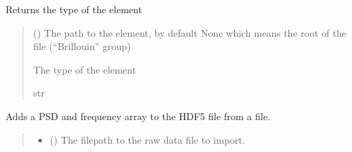 \documentclass[letterpaper,10pt,english]{sphinxmanual}
\begin{document}
\begin{fulllineitems}

\begin{fulllineitems}
\label{\detokenize{source/_autosummary/HDF5_BLS.Wrapper:HDF5_BLS.Wrapper.get_type}}
\pysigstartsignatures
\pysiglinewithargsret
{}
{\sphinxparamcomma {}}
{}
\pysigstopsignatures
\sphinxAtStartPar
Returns the type of the element
\begin{quote}\begin{description}
\sphinxAtStartPar
{} (\sphinxstyleliteralemphasis{\sphinxupquote{, }}) \textendash{} The path to the element, by default None which means the root of the file (“Brillouin” group)

\sphinxAtStartPar
The type of the element

\sphinxAtStartPar
str

\end{description}\end{quote}

\end{fulllineitems}


\begin{fulllineitems}
\label{\detokenize{source/_autosummary/HDF5_BLS.Wrapper:HDF5_BLS.Wrapper.import_PSD}}
\pysigstartsignatures
\pysiglinewithargsret
{}
{\sphinxparamcomma {}\sphinxparamcomma {}\sphinxparamcomma {}\sphinxparamcomma {}\sphinxparamcomma {}\sphinxparamcomma {}}
{}
\pysigstopsignatures
\sphinxAtStartPar
Adds a PSD and frequency array to the HDF5 file from a file.
\begin{quote}\begin{description}
\begin{itemize}
\item {} 
\sphinxAtStartPar
{} () \textendash{} The filepath to the raw data file to import.


\end{itemize}
\end{description}
\end{quote}
\end{fulllineitems}
\end{fulllineitems}
\end{document}
